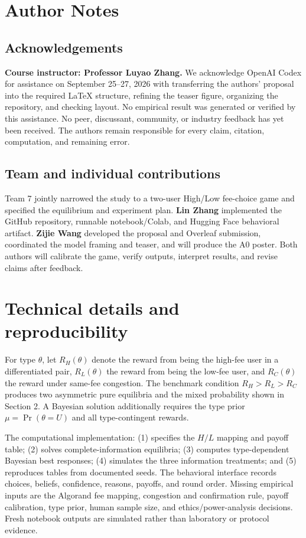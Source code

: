 \clearpage\nobalance
\section*{Author Notes}
\subsection*{Acknowledgements}
\textbf{Course instructor: Professor Luyao Zhang.} We acknowledge OpenAI Codex for assistance on September 25--27, 2026 with transferring the authors' proposal into the required LaTeX structure, refining the teaser figure, organizing the repository, and checking layout. No empirical result was generated or verified by this assistance. No peer, discussant, community, or industry feedback has yet been received. The authors remain responsible for every claim, citation, computation, and remaining error.

\subsection*{Team and individual contributions}
Team 7 jointly narrowed the study to a two-user High/Low fee-choice game and specified the equilibrium and experiment plan. \textbf{Lin Zhang} implemented the GitHub repository, runnable notebook/Colab, and Hugging Face behavioral artifact. \textbf{Zijie Wang} developed the proposal and Overleaf submission, coordinated the model framing and teaser, and will produce the A0 poster. Both authors will calibrate the game, verify outputs, interpret results, and revise claims after feedback.


\appendix
\section{Technical details and reproducibility}
For type $\theta$, let $R_H(\theta)$ denote the reward from being the high-fee user in a differentiated pair, $R_L(\theta)$ the reward from being the low-fee user, and $R_C(\theta)$ the reward under same-fee congestion. The benchmark condition $R_H>R_L>R_C$ produces two asymmetric pure equilibria and the mixed probability shown in Section 2. A Bayesian solution additionally requires the type prior $\mu=\Pr(\theta=U)$ and all type-contingent rewards.

The computational implementation: (1) specifies the $H/L$ mapping and payoff table; (2) solves complete-information equilibria; (3) computes type-dependent Bayesian best responses; (4) simulates the three information treatments; and (5) reproduces tables from documented seeds. The behavioral interface records choices, beliefs, confidence, reasons, payoffs, and round order. Missing empirical inputs are the Algorand fee mapping, congestion and confirmation rule, payoff calibration, type prior, human sample size, and ethics/power-analysis decisions. Fresh notebook outputs are simulated rather than laboratory or protocol evidence.


